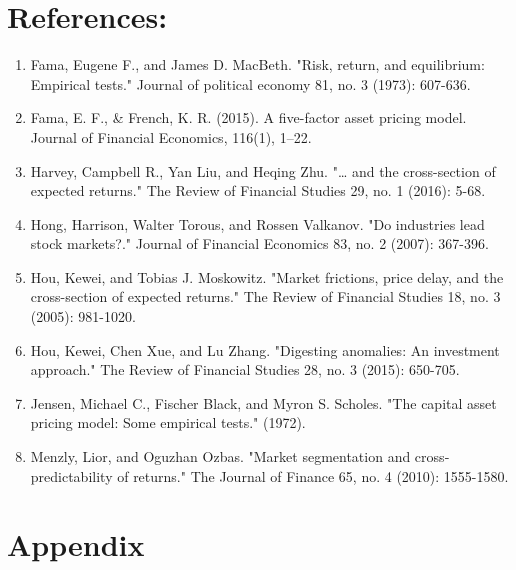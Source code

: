 \documentclass[12pt]{article}
\begin{document}
\newpage
\section{References:}
\begin{enumerate}


    \item {Fama, Eugene F., and James D. MacBeth. "Risk, return, and equilibrium: Empirical tests." Journal of political economy 81, no. 3 (1973): 607-636.}
    \item {Fama, E. F., \& French, K. R. (2015). A five-factor asset pricing model. Journal of Financial Economics, 116(1), 1–22. }
    \item {Harvey, Campbell R., Yan Liu, and Heqing Zhu. "… and the cross-section of expected returns." The Review of Financial Studies 29, no. 1 (2016): 5-68.}
    \item {Hong, Harrison, Walter Torous, and Rossen Valkanov. "Do industries lead stock markets?." Journal of Financial Economics 83, no. 2 (2007): 367-396.}
    \item {Hou, Kewei, and Tobias J. Moskowitz. "Market frictions, price delay, and the cross-section of expected returns." The Review of Financial Studies 18, no. 3 (2005): 981-1020.}
    \item {Hou, Kewei, Chen Xue, and Lu Zhang. "Digesting anomalies: An investment approach." The Review of Financial Studies 28, no. 3 (2015): 650-705.}
     \item {Jensen, Michael C., Fischer Black, and Myron S. Scholes. "The capital asset pricing model: Some empirical tests." (1972).}
    \item {Menzly, Lior, and Oguzhan Ozbas. "Market segmentation and cross‐predictability of returns." The Journal of Finance 65, no. 4 (2010): 1555-1580.}


\end{enumerate}

\newpage


\section*{Appendix}
\end{document}

